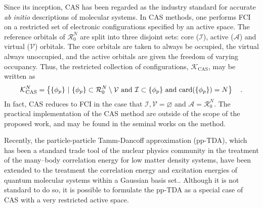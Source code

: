 Since its inception, CAS has been regarded as the industry standard for accurate
\emph{ab initio} descriptions of molecular systems.  In CAS methods, one
performs FCI on a restricted set of electronic configurations specified by an
active space. The reference orbitals of $\mathcal{R}^N_0$ are split into three
disjoint sets: core ($\mathcal{I}$), active ($\mathcal{A}$) and virtual
($\mathcal{V}$) orbitals.  The core orbitals are taken to always be occupied,
the virtual always unoccupied, and the active orbitals are given the freedom of
varying occupancy.  Thus, the restricted collection of configurations,
$\mathcal{K}_\mathrm{CAS}$, may be written as
\begin{equation}
\mathcal{K}^N_\mathrm{CAS} = 
\left\lbrace \{ \phi_p \} \text{ }\vert\text{ } 
\{ \phi_p \} \subset \mathcal{R}^N_0 \setminus \mathcal{V} \text{ and } 
\mathcal{I} \subset \{ \phi_p \} \text{ and }
\mathrm{card}(\{ \phi_p \}) = N \right\rbrace
\quad. \label{eq:CASAnsatz}
\end{equation}
In fact, CAS reduces to FCI in the case that 
$\mathcal{I},\mathcal{V} = \varnothing$ and $\mathcal{A} = \mathcal{R}_0^N$.
The practical implementation of the CAS method are outside of the scope of the
proposed work, and may be found in the seminal works on the method.


Recently, the particle-particle Tamm-Dancoff approximation (pp-TDA), which has
been a standard trade tool of the nuclear physics community in the treatment of
the many--body correlation energy for low matter density
systems\cite{SchuckBook_04}, have been extended to the treatment the correlation
energy and excitation energies of quantum molecular systems within a Gaussian 
basis set.\cite{Yang13_224105,Yang13_18A522,
Yang13_174110,Yang13_104112,Yang13_030501,Yang09_066403,Bulik13_104113}.
Although it is not standard to do so, it is possible to formulate the pp-TDA as
a special case of CAS with a very restricted active space.

